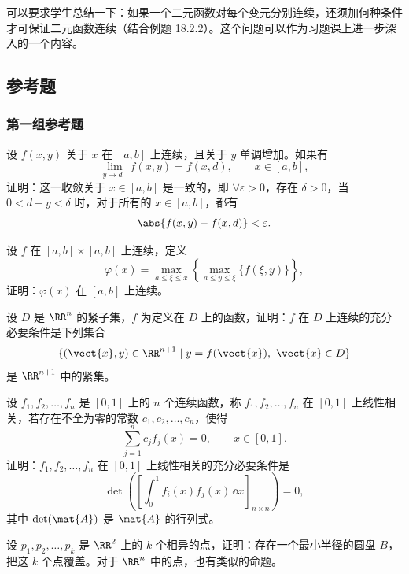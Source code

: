 可以要求学生总结一下：如果一个二元函数对每个变元分别连续，还须加何种条件才可保证二元函数连续（结合例题 18.2.2）。这个问题可以作为习题课上进一步深入的一个内容。

\subsection{参考题}

\subsubsection*{第一组参考题}

\begin{xreferenceproblem}[1]
设 $f(x,y)$ 关于 $x$ 在 $[a,b]$ 上连续，且关于 $y$ 单调增加。如果有
  \[
    \lim_{y\to d^-}f(x,y)=f(x,d),\qquad x\in[a,b],
  \]
  证明：这一收敛关于 $x\in[a,b]$ 是一致的，即 $\forall\varepsilon>0$，存在 $\delta>0$，当 $0<d-y<\delta$ 时，对于所有的 $x\in[a,b]$，都有
  \[
    \abs{f(x,y)-f(x,d)}<\varepsilon.
  \]
\end{xreferenceproblem}

\begin{xreferenceproblem}[2]
设 $f$ 在 $[a,b]\times[a,b]$ 上连续，定义
  \[
    \varphi(x)=\max_{a\le\xi\le x}
    \left\{\max_{a\le y\le\xi}\{f(\xi,y)\}\right\},
  \]
  证明：$\varphi(x)$ 在 $[a,b]$ 上连续。
\end{xreferenceproblem}

\begin{xreferenceproblem}[3]
设 $D$ 是 $\RR^n$ 的紧子集，$f$ 为定义在 $D$ 上的函数，证明：$f$ 在 $D$ 上连续的充分必要条件是下列集合
  \[
    \{(\vect{x},y)\in\RR^{n+1}\mid y=f(\vect{x}),\ \vect{x}\in D\}
  \]
  是 $\RR^{n+1}$ 中的紧集。
\end{xreferenceproblem}

\begin{xreferenceproblem}[4]
设 $f_1,f_2,\ldots,f_n$ 是 $[0,1]$ 上的 $n$ 个连续函数，称 $f_1,f_2,\ldots,f_n$ 在 $[0,1]$ 上线性相关，若存在不全为零的常数 $c_1,c_2,\ldots,c_n$，使得
  \[
    \sum_{j=1}^n c_jf_j(x)=0,\qquad x\in[0,1].
  \]
  证明：$f_1,f_2,\ldots,f_n$ 在 $[0,1]$ 上线性相关的充分必要条件是
  \[
    \det\left(\left[\int_0^1 f_i(x)f_j(x)\,\dd x\right]_{n\times n}\right)=0,
  \]
  其中 $\det(\mat{A})$ 是 $\mat{A}$ 的行列式。
\end{xreferenceproblem}

\begin{xreferenceproblem}[5]
设 $p_1,p_2,\ldots,p_k$ 是 $\RR^2$ 上的 $k$ 个相异的点，证明：存在一个最小半径的圆盘 $B$，把这 $k$ 个点覆盖。对于 $\RR^n$ 中的点，也有类似的命题。
\end{xreferenceproblem}

